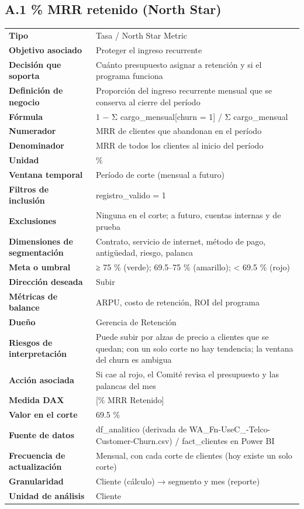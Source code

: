 \subsection*{A.1 \% MRR retenido (North Star)}
\begin{footnotesize}
\begin{longtable}{@{}p{}p{}@{}}
\toprule
\textbf{Tipo} & Tasa / North Star Metric \\
\textbf{Objetivo asociado} & Proteger el ingreso recurrente \\
\textbf{Decisión que soporta} & Cuánto presupuesto asignar a retención y si el programa funciona \\
\textbf{Definición de negocio} & Proporción del ingreso recurrente mensual que se conserva al cierre del período \\
\textbf{Fórmula} & 1 − Σ cargo\_mensual[churn = 1] / Σ cargo\_mensual \\
\textbf{Numerador} & MRR de clientes que abandonan en el período \\
\textbf{Denominador} & MRR de todos los clientes al inicio del período \\
\textbf{Unidad} & \% \\
\textbf{Ventana temporal} & Período de corte (mensual a futuro) \\
\textbf{Filtros de inclusión} & registro\_valido = 1 \\
\textbf{Exclusiones} & Ninguna en el corte; a futuro, cuentas internas y de prueba \\
\textbf{Dimensiones de segmentación} & Contrato, servicio de internet, método de pago, antigüedad, riesgo, palanca \\
\textbf{Meta o umbral} & ≥ 75 \% (verde); 69.5–75 \% (amarillo); < 69.5 \% (rojo) \\
\textbf{Dirección deseada} & Subir \\
\textbf{Métricas de balance} & ARPU, costo de retención, ROI del programa \\
\textbf{Dueño} & Gerencia de Retención \\
\textbf{Riesgos de interpretación} & Puede subir por alzas de precio a clientes que se quedan; con un solo corte no hay tendencia; la ventana del churn es ambigua \\
\textbf{Acción asociada} & Si cae al rojo, el Comité revisa el presupuesto y las palancas del mes \\
\textbf{Medida DAX} & [\% MRR Retenido] \\
\textbf{Valor en el corte} & 69.5 \% \\
\textbf{Fuente de datos} & df\_analitico (derivada de WA\_Fn-UseC\_-Telco-Customer-Churn.csv) / fact\_clientes en Power BI \\
\textbf{Frecuencia de actualización} & Mensual, con cada corte de clientes (hoy existe un solo corte) \\
\textbf{Granularidad} & Cliente (cálculo) → segmento y mes (reporte) \\
\textbf{Unidad de análisis} & Cliente \\
\bottomrule
\end{longtable}
\end{footnotesize}

